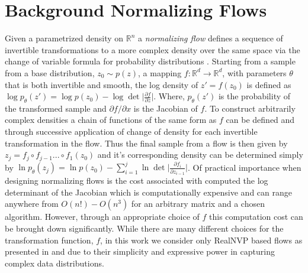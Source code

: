 \section{Background Normalizing Flows}
\label{normalizing_flow_appendix}
Given a parametrized density on $\mathbb{R}^n$ a \textit{normalizing flow} defines a sequence of invertible transformations to a more complex density over the same space via the change of variable formula for probability distributions \cite{rezende2015variational}. Starting from a sample from a base distribution, $z_0 \sim p(z)$, a mapping $f: \mathbb{R}^d \to \mathbb{R}^d$, with parameters $\theta$ that is both invertible and smooth, the log density of $z' = f(z_0)$ is defined as $\log p_{\theta}(z') = \log p(z_0) - \log \det \Big \lvert \frac{\partial f}{\partial z} \Big \rvert$.
Where, $p_{\theta}(z')$ is the probability of the transformed sample and $\partial f / \partial x$ is the Jacobian of $f$. To construct arbitrarily complex densities a chain of functions of the same form as $f$ can be defined and through successive application of change of density for each invertible transformation in the flow. Thus the final sample from a flow is then given by $z_j = f_j \circ f_{j-1} ... \circ f_1(z_0)$ and it's corresponding density can be determined simply by $\ln p_{\theta}(z_j) = \ln p(z_0) - \sum_{i=1}^j\ln \det \Big \lvert \frac{\partial f_i}{\partial z_{i-1}} \Big \rvert$. 
Of practical importance when designing normalizing flows is the cost associated with computed the log determinant of the Jacobian which is computationally expensive and can range anywhere from $O(n!)-O(n^3)$ for an arbitrary matrix and a chosen algorithm. However, through an appropriate choice of $f$ this computation cost can be brought down significantly. While there are many different choices for the transformation function, $f$, in this work we consider only RealNVP based flows as presented in \cite{dinh2016density} and \cite{rezende2015variational} due to their simplicity and expressive power in capturing complex data distributions.

